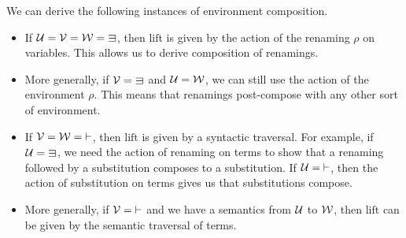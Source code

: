 \begin{example}
  We can derive the following instances of environment composition.
  \begin{itemize}
    \item If $\U = \V = \W = {\sqni}$, then $\mathrm{lift}$ is given by the
      action of the renaming $\rho$ on variables.
      This allows us to derive composition of renamings.
    \item More generally, if $\V = {\sqni}$ and $\mathcal U = \mathcal W$, we can still use
      the action of the environment $\rho$.
      This means that renamings post-compose with any other sort of environment.
    \item If $\mathcal V = \mathcal W = {\vdash}$, then $\mathrm{lift}$ is given by a
      syntactic traversal.
      For example, if $\U = {\sqni}$, we need the action of renaming on terms
      to show that a renaming followed by a substitution composes to a
      substitution.
      If $\mathcal U = {\vdash}$, then the action of substitution on terms gives us that
      substitutions compose.
    \item More generally, if $\mathcal V = {\vdash}$ and we have a semantics from
      $\mathcal U$ to $\mathcal W$, then $\mathrm{lift}$ can be given by the semantic traversal
      of terms.
  \end{itemize}
\end{example}
